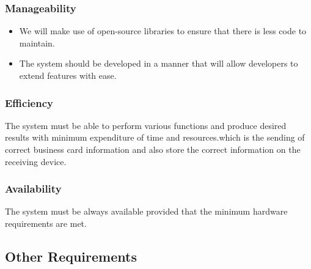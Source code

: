 \documentclass[english]{article}
\begin{document}
				\subsubsection{Manageability}
					\begin{itemize}
							\item We will make use of open-source libraries to ensure that there is less code to maintain.
							\item The system should be developed in a manner that will allow developers to extend features with ease.
						\end{itemize}
	
				    
				\subsubsection{Efficiency}
				  The system must be able to perform various functions and produce desired results with minimum expenditure of time and resources.which is the sending of correct business card information and also store the correct information on the receiving device.
				\subsubsection{Availability}
	                          The system must be always available provided that the minimum hardware requirements are met.
				 
	
				
				

				\subsection{Other Requirements}
				

	
\end{document}
